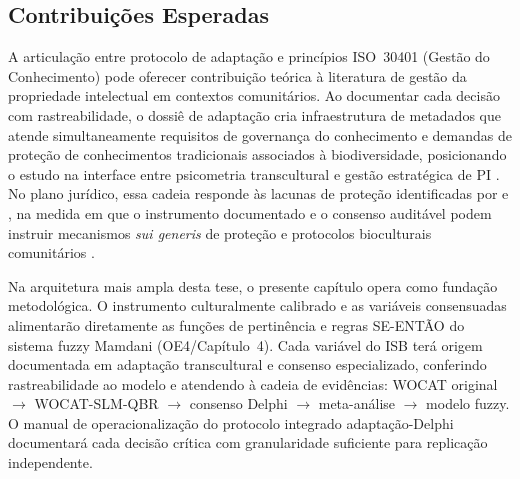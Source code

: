 \subsection{Contribuições Esperadas}

A articulação entre protocolo de adaptação e princípios ISO~30401 (Gestão do Conhecimento) pode oferecer contribuição teórica à literatura de gestão da propriedade intelectual em contextos comunitários. Ao documentar cada decisão com rastreabilidade, o dossiê de adaptação cria infraestrutura de metadados que atende simultaneamente requisitos de governança do conhecimento \cite{ISO30401} e demandas de proteção de conhecimentos tradicionais associados à biodiversidade, posicionando o estudo na interface entre psicometria transcultural e gestão estratégica de PI \cite{Teece1986,ISO56005}. No plano jurídico, essa cadeia responde às lacunas de proteção identificadas por  e , na medida em que o instrumento documentado e o consenso auditável podem instruir mecanismos \textit{sui generis} de proteção e protocolos bioculturais comunitários \cite{BavikatteRobinson2011,Nemoga2022,Robinson2014}.

Na arquitetura mais ampla desta tese, o presente capítulo opera como fundação metodológica. O instrumento culturalmente calibrado e as variáveis consensuadas alimentarão diretamente as funções de pertinência e regras SE-ENTÃO do sistema fuzzy Mamdani (OE4/Capítulo~4). Cada variável do ISB terá origem documentada em adaptação transcultural e consenso especializado, conferindo rastreabilidade ao modelo \cite{Costanza1997} e atendendo à cadeia de evidências: WOCAT original $\rightarrow$ WOCAT-SLM-QBR $\rightarrow$ consenso Delphi $\rightarrow$ meta-análise $\rightarrow$ modelo fuzzy. O manual de operacionalização do protocolo integrado adaptação-Delphi documentará cada decisão crítica com granularidade suficiente para replicação independente.


